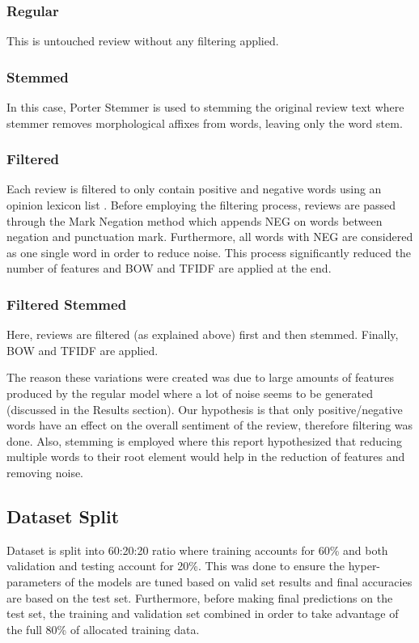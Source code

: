 \documentclass[conference , 11pt]{IEEEtran}
\begin{document}
\subsubsection{Regular}
This is untouched review without any filtering applied.
\subsubsection{Stemmed}
In this case, Porter Stemmer is used to stemming the original review text where stemmer removes morphological affixes from words, leaving only the word stem.
\subsubsection{Filtered}
Each review is filtered to only contain positive and negative words using an opinion lexicon list \cite{opinion}. Before employing the filtering process, reviews are passed through the Mark Negation method \cite{nltk} which appends NEG on words between negation and punctuation mark. Furthermore, all words with NEG are considered as one single word in order to reduce noise. This process significantly reduced the number of features and BOW and TFIDF are applied at the end.
\subsubsection{Filtered Stemmed}
Here, reviews are filtered (as explained above) first and then stemmed. Finally, BOW and TFIDF are applied.

The reason these variations were created was due to large amounts of features produced by the regular model where a lot of noise seems to be generated (discussed in the Results section). Our hypothesis is that only positive/negative words have an effect on the overall sentiment of the review, therefore filtering was done. Also, stemming is employed where this report hypothesized that reducing multiple words to their root element would help in the reduction of features and removing noise.


\subsection{Dataset Split}
Dataset is split into 60:20:20 ratio where training accounts for 60\% and both validation and testing account for 20\%. This was done to ensure the hyper-parameters of the models are tuned based on valid set results and final accuracies are based on the test set. Furthermore, before making final predictions on the test set, the training and validation set combined in order to take advantage of the full 80\% of allocated training data.
\end{document}

